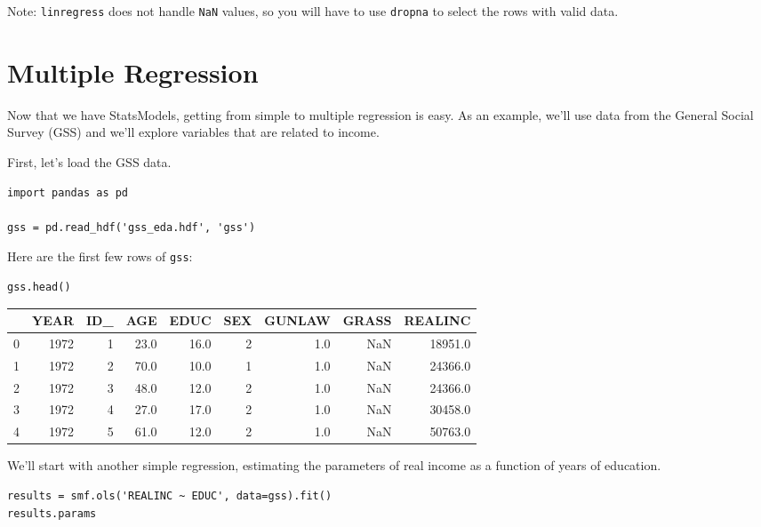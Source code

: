 Note: \passthrough{\lstinline!linregress!} does not handle
\passthrough{\lstinline!NaN!} values, so you will have to use
\passthrough{\lstinline!dropna!} to select the rows with valid data.

\hypertarget{multiple-regression}{%
\section{Multiple Regression}\label{multiple-regression}}

Now that we have StatsModels, getting from simple to multiple regression
is easy. As an example, we'll use data from the General Social Survey
(GSS) and we'll explore variables that are related to income.

First, let's load the GSS data.

\begin{lstlisting}[]
import pandas as pd

gss = pd.read_hdf('gss_eda.hdf', 'gss')
\end{lstlisting}

Here are the first few rows of \passthrough{\lstinline!gss!}:

\begin{lstlisting}[]
gss.head()
\end{lstlisting}

\begin{tabular}{lrrrrrrrr}
\midrule
{} &  YEAR &  ID\_ &   AGE &  EDUC &  SEX &  GUNLAW &  GRASS &  REALINC \\
\midrule
0 &  1972 &    1 &  23.0 &  16.0 &    2 &     1.0 &    NaN &  18951.0 \\
1 &  1972 &    2 &  70.0 &  10.0 &    1 &     1.0 &    NaN &  24366.0 \\
2 &  1972 &    3 &  48.0 &  12.0 &    2 &     1.0 &    NaN &  24366.0 \\
3 &  1972 &    4 &  27.0 &  17.0 &    2 &     1.0 &    NaN &  30458.0 \\
4 &  1972 &    5 &  61.0 &  12.0 &    2 &     1.0 &    NaN &  50763.0 \\
\midrule
\end{tabular}

We'll start with another simple regression, estimating the parameters of
real income as a function of years of education.

\begin{lstlisting}[]
results = smf.ols('REALINC ~ EDUC', data=gss).fit()
results.params
\end{lstlisting}

